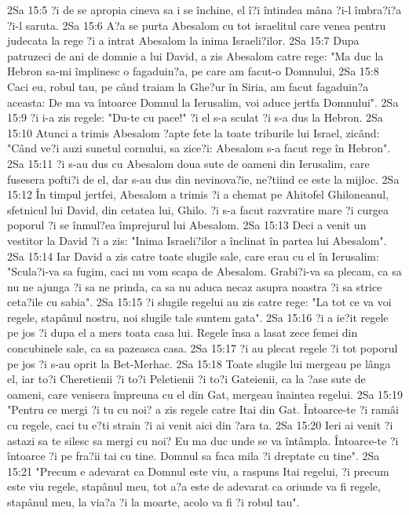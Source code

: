 2Sa 15:5  ?i de se apropia cineva sa i se închine, el î?i întindea mâna ?i-l îmbra?i?a ?i-l saruta.
2Sa 15:6  A?a se purta Abesalom cu tot israelitul care venea pentru judecata la rege ?i a intrat Abesalom la inima Israeli?ilor.
2Sa 15:7  Dupa patruzeci de ani de domnie a lui David, a zis Abesalom catre rege: "Ma duc la Hebron sa-mi împlinesc o fagaduin?a, pe care am facut-o Domnului,
2Sa 15:8  Caci eu, robul tau, pe când traiam la Ghe?ur în Siria, am facut fagaduin?a aceasta: De ma va întoarce Domnul la Ierusalim, voi aduce jertfa Domnului".
2Sa 15:9  ?i i-a zis regele: "Du-te cu pace!" ?i el s-a sculat ?i s-a dus la Hebron.
2Sa 15:10  Atunci a trimis Abesalom ?apte fete la toate triburile lui Israel, zicând: "Când ve?i auzi sunetul cornului, sa zice?i: Abesalom s-a facut rege în Hebron".
2Sa 15:11  ?i s-au dus cu Abesalom doua sute de oameni din Ierusalim, care fusesera pofti?i de el, dar s-au dus din nevinova?ie, ne?tiind ce este la mijloc.
2Sa 15:12  În timpul jertfei, Abesalom a trimis ?i a chemat pe Ahitofel Ghiloneanul, sfetnicul lui David, din cetatea lui, Ghilo. ?i s-a facut razvratire mare ?i curgea poporul ?i se înmul?ea împrejurul lui Abesalom.
2Sa 15:13  Deci a venit un vestitor la David ?i a zis: "Inima Israeli?ilor a înclinat în partea lui Abesalom".
2Sa 15:14  Iar David a zis catre toate slugile sale, care erau cu el în Ierusalim: "Scula?i-va sa fugim, caci nu vom scapa de Abesalom. Grabi?i-va sa plecam, ca sa nu ne ajunga ?i sa ne prinda, ca sa nu aduca necaz asupra noastra ?i sa strice ceta?ile cu sabia".
2Sa 15:15  ?i slugile regelui au zis catre rege: "La tot ce va voi regele, stapânul nostru, noi slugile tale suntem gata".
2Sa 15:16  ?i a ie?it regele pe jos ?i dupa el a mers toata casa lui. Regele însa a lasat zece femei din concubinele sale, ca sa pazeasca casa.
2Sa 15:17  ?i au plecat regele ?i tot poporul pe jos ?i s-au oprit la Bet-Merhac.
2Sa 15:18  Toate slugile lui mergeau pe lânga el, iar to?i Cheretienii ?i to?i Peletienii ?i to?i Gateienii, ca la ?ase sute de oameni, care venisera împreuna cu el din Gat, mergeau înaintea regelui.
2Sa 15:19  "Pentru ce mergi ?i tu cu noi? a zis regele catre Itai din Gat. Întoarce-te ?i ramâi cu regele, caci tu e?ti strain ?i ai venit aici din ?ara ta.
2Sa 15:20  Ieri ai venit ?i astazi sa te silesc sa mergi cu noi? Eu ma duc unde se va întâmpla. Întoarce-te ?i întoarce ?i pe fra?ii tai cu tine. Domnul sa faca mila ?i dreptate cu tine".
2Sa 15:21  "Precum e adevarat ca Domnul este viu, a raspuns Itai regelui, ?i precum este viu regele, stapânul meu, tot a?a este de adevarat ca oriunde va fi regele, stapânul meu, la via?a ?i la moarte, acolo va fi ?i robul tau".
